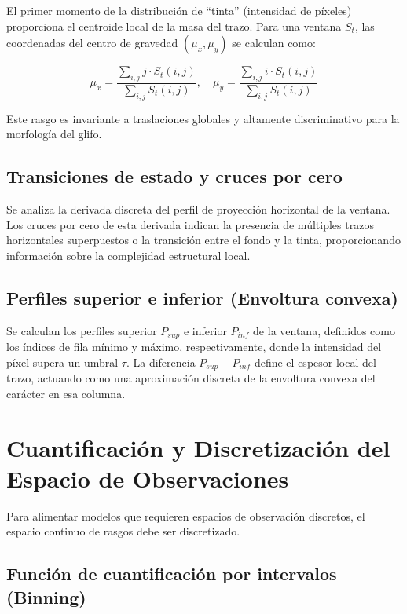 \documentclass[
  spanish,
  us-letterpaper,
  DIV=11,
  numbers=noendperiod]{scrreprt}
\begin{document}
El primer momento de la distribución de ``tinta'' (intensidad de
píxeles) proporciona el centroide local de la masa del trazo. Para una
ventana \(S_t\), las coordenadas del centro de gravedad
\((\mu_x, \mu_y)\) se calculan como:

\[
\mu_x = \frac{\sum_{i,j} j \cdot S_t(i,j)}{\sum_{i,j} S_t(i,j)}, \quad
\mu_y = \frac{\sum_{i,j} i \cdot S_t(i,j)}{\sum_{i,j} S_t(i,j)}
\]

Este rasgo es invariante a traslaciones globales y altamente
discriminativo para la morfología del glifo.

\subsection{Transiciones de estado y cruces por
cero}\label{transiciones-de-estado-y-cruces-por-cero}

Se analiza la derivada discreta del perfil de proyección horizontal de
la ventana. Los cruces por cero de esta derivada indican la presencia de
múltiples trazos horizontales superpuestos o la transición entre el
fondo y la tinta, proporcionando información sobre la complejidad
estructural local.

\subsection{Perfiles superior e inferior (Envoltura
convexa)}\label{perfiles-superior-e-inferior-envoltura-convexa}

Se calculan los perfiles superior \(P_{sup}\) e inferior \(P_{inf}\) de
la ventana, definidos como los índices de fila mínimo y máximo,
respectivamente, donde la intensidad del píxel supera un umbral
\(\tau\). La diferencia \(P_{sup} - P_{inf}\) define el espesor local
del trazo, actuando como una aproximación discreta de la envoltura
convexa del carácter en esa columna.

\section{Cuantificación y Discretización del Espacio de
Observaciones}\label{cuantificaciuxf3n-y-discretizaciuxf3n-del-espacio-de-observaciones}

Para alimentar modelos que requieren espacios de observación discretos,
el espacio continuo de rasgos debe ser discretizado.

\subsection{Función de cuantificación por intervalos
(Binning)}\label{funciuxf3n-de-cuantificaciuxf3n-por-intervalos-binning}
\end{document}
